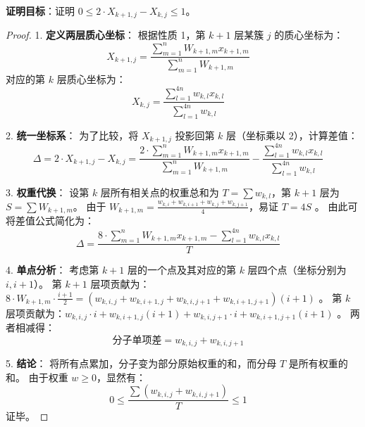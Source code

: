 \documentclass[11pt,a4paper]{article}
\begin{document}
\textbf{证明目标}：证明 $0 \le 2 \cdot X_{k+1,j} - X_{k,j} \le 1$。

\begin{proof}
1. \textbf{定义两层质心坐标}：
根据性质 1，第 $k+1$ 层某簇 $j$ 的质心坐标为：
\begin{equation}
    X_{k+1,j} = \frac{\sum_{m=1}^{n} W_{k+1,m} x_{k+1,m}}{\sum_{m=1}^{n} W_{k+1,m}} \quad \text{}
\end{equation}
对应的第 $k$ 层质心坐标为：
\begin{equation}
    X_{k,j} = \frac{\sum_{l=1}^{4n} w_{k,l} x_{k,l}}{\sum_{l=1}^{4n} w_{k,l}} \quad \text{}
\end{equation}

2. \textbf{统一坐标系}：
为了比较，将 $X_{k+1,j}$ 投影回第 $k$ 层（坐标乘以 2），计算差值：
\begin{equation}
    \Delta = 2 \cdot X_{k+1,j} - X_{k,j} = \frac{2 \cdot \sum_{m=1}^{n} W_{k+1,m} x_{k+1,m}}{\sum_{m=1}^{n} W_{k+1,m}} - \frac{\sum_{l=1}^{4n} w_{k,l} x_{k,l}}{\sum_{l=1}^{4n} w_{k,l}} \quad \text{}
\end{equation}

3. \textbf{权重代换}：
设第 $k$ 层所有相关点的权重总和为 $T = \sum w_{k,l}$，第 $k+1$ 层为 $S = \sum W_{k+1,m}$。
由于 $W_{k+1,m} = \frac{w_{k,i} + w_{k,i+1} + w_{k,j} + w_{k,j+1}}{4}$，易证 $T = 4S$ 。
由此可将差值公式简化为：
\begin{equation}
    \Delta = \frac{8 \cdot \sum_{m=1}^{n} W_{k+1,m} x_{k+1,m} - \sum_{l=1}^{4n} w_{k,l} x_{k,l}}{T} \quad \text{}
\end{equation}

4. \textbf{单点分析}：
考虑第 $k+1$ 层的一个点及其对应的第 $k$ 层四个点（坐标分别为 $i, i+1$）。
第 $k+1$ 层项贡献为：$8 \cdot W_{k+1,m} \cdot \frac{i+1}{2} = (w_{k,i,j} + w_{k,i+1,j} + w_{k,i,j+1} + w_{k,i+1,j+1})(i+1)$ 。
第 $k$ 层项贡献为：$w_{k,i,j} \cdot i + w_{k,i+1,j}(i+1) + w_{k,i,j+1} \cdot i + w_{k,i+1,j+1}(i+1)$ 。
两者相减得：
\begin{equation}
    \text{分子单项差} = w_{k,i,j} + w_{k,i,j+1} \quad \text{}
\end{equation}

5. \textbf{结论}：
将所有点累加，分子变为部分原始权重的和，而分母 $T$ 是所有权重的和。
由于权重 $w \ge 0$，显然有：
\begin{equation}
    0 \le \frac{\sum (w_{k,i,j} + w_{k,i,j+1})}{T} \le 1 \quad \text{}
\end{equation}
证毕。
\end{proof}
\end{document}
